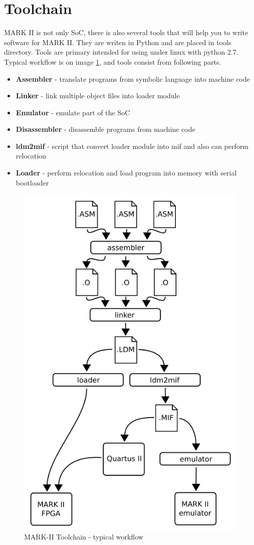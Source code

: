 \section{Toolchain}

MARK II is not only SoC, there is also several tools that will help you to
write software for MARK II. They are writen in Python and are placed in tools
directory. Tools are primary intended for using under linux with python 2.7.
Typical workflow is on image \ref{fig:toolchain_workflow}, and tools consist
from following parts.

\begin{itemize}
    \item \textbf{Assembler} - translate programs from symbolic language into machine code
    \item \textbf{Linker} - link multiple object files into loader module
    \item \textbf{Emulator} - emulate part of the SoC
    \item \textbf{Disassembler} - disassemble programs from machine code
    \item \textbf{ldm2mif} - script that convert loader module into mif and also can perform relocation
    \item \textbf{Loader} - perform relocation and load program into memory with serial bootloader
\end{itemize}

\begin{figure}[]
    \centering
    \includegraphics[width=.7\textwidth]{img/toolworkflow.png}
    \caption{MARK-II Toolchain - typical workflow}
    \label{fig:toolchain_workflow}
\end{figure}

